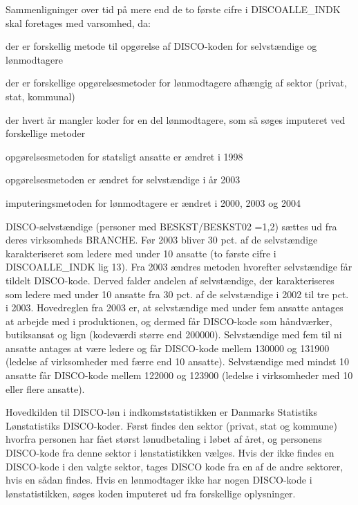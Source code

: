 Sammenligninger over tid på mere end de to første cifre i DISCOALLE\_INDK skal foretages med varsomhed, da:
\begin{description}
  \item der er forskellig metode til opgørelse af DISCO-koden for selvstændige og lønmodtagere
  \item der er forskellige opgørelsesmetoder for lønmodtagere afhængig af sektor (privat, stat, kommunal)
  \item der hvert år mangler koder for en del lønmodtagere, som så søges imputeret ved forskellige metoder
  \item opgørelsesmetoden for statsligt ansatte er ændret i 1998
  \item opgørelsesmetoden er ændret for selvstændige i år 2003
  \item imputeringsmetoden for lønmodtagere er ændret i 2000, 2003 og 2004
\end{description}

DISCO-selvstændige (personer med BESKST/BESKST02 =1,2) sættes ud fra deres virksomheds BRANCHE. Før 2003 bliver 30 pct. af de selvstændige karakteriseret som ledere med under 10 ansatte (to første cifre i DISCOALLE\_INDK lig 13). Fra 2003 ændres metoden hvorefter selvstændige får tildelt DISCO-kode. Derved falder andelen af selvstændige, der karakteriseres som ledere med under 10 ansatte fra 30 pct. af de selvstændige i 2002 til tre pct. i 2003. Hovedreglen fra 2003 er, at selvstændige med under fem ansatte antages at arbejde med i produktionen, og dermed får DISCO-kode som håndværker, butiksansat og lign (kodeværdi større end 200000). Selvstændige med fem til ni ansatte antages at være ledere og får DISCO-kode mellem 130000 og 131900 (ledelse af virksomheder med færre end 10 ansatte). Selvstændige med mindst 10 ansatte får DISCO-kode mellem 122000 og 123900 (ledelse i virksomheder med 10 eller flere ansatte).

Hovedkilden til DISCO-løn i indkomststatistikken er Danmarks Statistiks Lønstatistiks DISCO-koder. Først findes den sektor (privat, stat og kommune) hvorfra personen har fået størst lønudbetaling i løbet af året, og personens DISCO-kode fra denne sektor i lønstatistikken vælges. Hvis der ikke findes en DISCO-kode i den valgte sektor, tages DISCO kode fra en af de andre sektorer, hvis en sådan findes. Hvis en lønmodtager ikke har nogen DISCO-kode i lønstatistikken, søges koden imputeret ud fra forskellige oplysninger.

